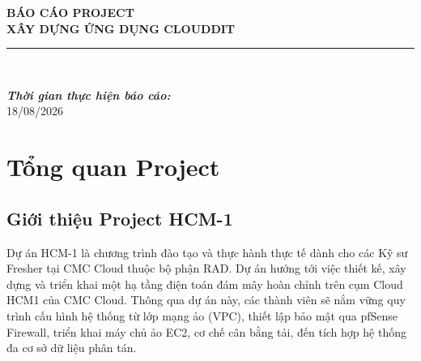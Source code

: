 \documentclass[12pt, a4paper]{article}
\begin{document}
\begin{titlepage}
{{\begin{minipage}{0.82\textwidth}
            {\Large \textbf{BÁO CÁO PROJECT}}\\[0.5cm]

            {\huge \bfseries
            XÂY DỰNG ỨNG DỤNG CLOUDDIT
            }\\[0.5cm]

            \rule{0.85\linewidth}{0.6mm}\\[0.8cm]

            {\large
            \emph{\textbf{Thời gian thực hiện báo cáo:}}\\[0.2cm]
            18/08/2026
            \par}

            \vspace{0.4cm}

        \end{minipage}
    }%
}

\end{titlepage}


\tableofcontents
\clearpage


\listoffigures
\clearpage


\listoftables
\clearpage


\section{Tổng quan Project}

\subsection{Giới thiệu Project HCM-1}
Dự án HCM-1 là chương trình đào tạo và thực hành thực tế dành cho các Kỹ sư Fresher tại CMC Cloud thuộc bộ phận RAD. Dự án hướng tới việc thiết kế, xây dựng và triển khai một hạ tầng điện toán đám mây hoàn chỉnh trên cụm Cloud HCM1 của CMC Cloud. Thông qua dự án này, các thành viên sẽ nắm vững quy trình cấu hình hệ thống từ lớp mạng ảo (VPC), thiết lập bảo mật qua pfSense Firewall, triển khai máy chủ ảo EC2, cơ chế cân bằng tải, đến tích hợp hệ thống đa cơ sở dữ liệu phân tán.
\end{document}
